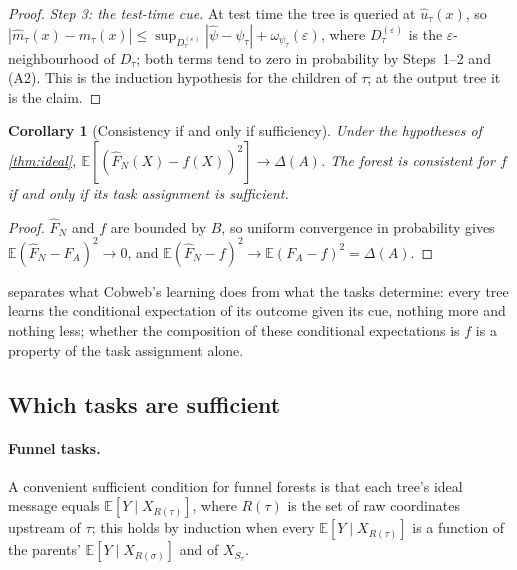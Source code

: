 \documentclass[11pt]{article}
\newtheorem{corollary}[theorem]{Corollary}
\theoremstyle{definition}
\theoremstyle{remark}
\newcommand{\E}{\mathbb{E}}
\begin{document}
\begin{proof}
\emph{Step 3: the test-time cue.}  At test time the tree is queried at $\hat u_\tau(x)$,
so $|\hat m_\tau(x)-m_\tau(x)|\le\sup_{D_\tau^{(\varepsilon)}}|\hat\psi-\psi_\tau|+
\omega_{\psi_\tau}(\varepsilon)$, where $D_\tau^{(\varepsilon)}$ is the
$\varepsilon$-neighbourhood of $D_\tau$; both terms tend to zero in probability by
Steps~1--2 and (A2).  This is the induction hypothesis for the children of $\tau$; at
the output tree it is the claim.
\end{proof}

\begin{corollary}[Consistency if and only if sufficiency]\label{cor:iff}
Under the hypotheses of \cref{thm:ideal}, $\E[(\hat F_N(X)-f(X))^2]\to\Delta(A)$.  The
forest is consistent for $f$ if and only if its task assignment is sufficient.
\end{corollary}
\begin{proof}
$\hat F_N$ and $f$ are bounded by $B$, so uniform convergence in probability gives
$\E(\hat F_N-F_A)^2\to0$, and $\E(\hat F_N-f)^2\to\E(F_A-f)^2=\Delta(A)$.
\end{proof}

 separates what Cobweb's learning does from what the tasks determine:
every tree learns the conditional expectation of its outcome given its cue, nothing more
and nothing less; whether the composition of these conditional expectations is $f$ is a
property of the task assignment alone.

\subsection{Which tasks are sufficient}

\paragraph{Funnel tasks.}
A convenient sufficient condition for funnel forests is that each tree's ideal message
equals $\E[Y\mid X_{R(\tau)}]$, where $R(\tau)$ is the set of raw coordinates upstream of
$\tau$; this holds by induction when every $\E[Y\mid X_{R(\tau)}]$ is a function of the
parents' $\E[Y\mid X_{R(\sigma)}]$ and of $X_{S_\tau}$.
\end{document}
